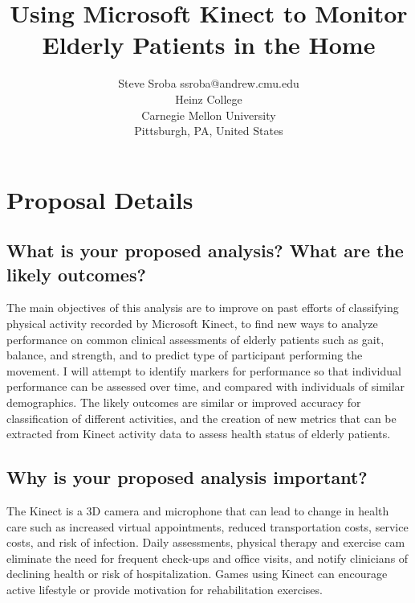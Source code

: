\documentclass[twoside,11pt]{article}
\begin{document}
\title{Using Microsoft Kinect to Monitor Elderly Patients in the Home}

\author{\name Steve Sroba \email ssroba@andrew.cmu.edu \\
       \addr Heinz College\\
       Carnegie Mellon University\\
       Pittsburgh, PA, United States} 

\maketitle


\section{Proposal Details} \label{details}


\subsection{What is your proposed analysis? What are the likely outcomes?}

  The main objectives of this analysis are to improve on past efforts of classifying physical activity recorded by Microsoft Kinect, to find new ways to analyze performance on common clinical assessments of elderly patients such as gait, balance, and strength, and to predict type of participant performing the movement. I will attempt to identify markers for performance so that individual performance can be assessed over time, and compared with individuals of similar demographics. The likely outcomes are similar or improved accuracy for classification of different activities, and the creation of new metrics that can be extracted from Kinect activity data to assess health status of elderly patients.

\subsection{Why is your proposed analysis important?}

  The Kinect is	a 3D camera and microphone that can lead to change in health care such as increased virtual appointments, reduced transportation costs, service costs, and risk of infection. Daily assessments, physical therapy and exercise cam eliminate the need for frequent check-ups and office visits, and notify clinicians of declining health or risk of hospitalization. Games using Kinect can encourage active lifestyle or provide motivation for rehabilitation exercises.
\end{document}
